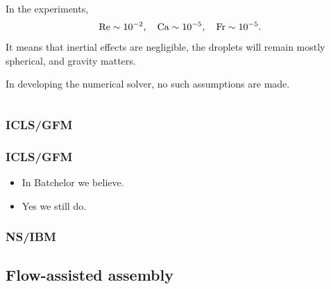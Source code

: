 \begin{frame}
\begin{columns}[T]
\begin{column}{0.4\textwidth}
      \pause
      \begin{flushleft}
        In the experiments, %
        \begin{equation} \notag
          \begin{aligned}
            \textrm{Re} \sim 10^{-2}, \quad
            \textrm{Ca} \sim 10^{-5}, \quad
            \textrm{Fr} \sim 10^{-5}.  
          \end{aligned}
        \end{equation}
        It means that inertial effects are negligible,
        the droplets will remain mostly spherical,
        and gravity matters.
        \vskip0.4cm

        \pause
        In developing the numerical solver, no such assumptions are made.
      \end{flushleft}
    \end{column}
    
  \end{columns}
  
\end{frame}

\hypertarget{icls}{%
  \subsubsection{ICLS/GFM}}

\begin{frame}
  \frametitle{ICLS/GFM}

  \begin{bluecolorbox}  
  \begin{itemize}
  \item
    In Batchelor we believe.
  \item
    Yes we still do.
  \end{itemize}  
  \end{bluecolorbox}  

\end{frame}

\hypertarget{ibm}{%
  \subsubsection{NS/IBM}}


\hypertarget{assembly}{%
  \subsection{Flow-assisted assembly}}

